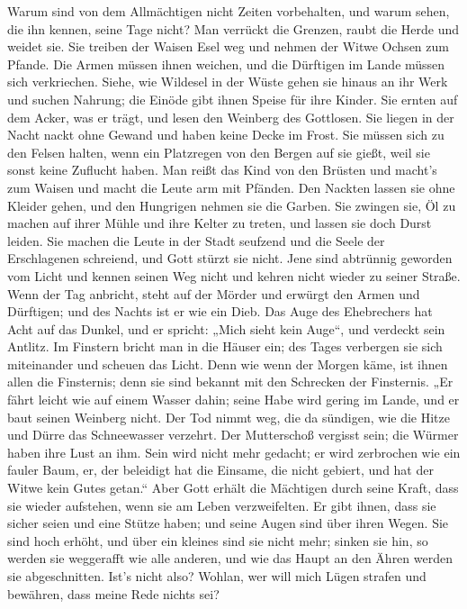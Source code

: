  Warum sind von dem Allmächtigen nicht Zeiten vorbehalten,
und warum sehen, die ihn kennen, seine Tage nicht?  Man
verrückt die Grenzen, raubt die Herde und weidet sie.  Sie
treiben der Waisen Esel weg und nehmen der Witwe Ochsen zum Pfande.
 Die Armen müssen ihnen weichen, und die Dürftigen im
Lande müssen sich verkriechen.  Siehe, wie Wildesel in der
Wüste gehen sie hinaus an ihr Werk und suchen Nahrung; die Einöde gibt
ihnen Speise für ihre Kinder.  Sie ernten auf dem Acker,
was er trägt, und lesen den Weinberg des Gottlosen.  Sie
liegen in der Nacht nackt ohne Gewand und haben keine Decke im Frost.
 Sie müssen sich zu den Felsen halten, wenn ein Platzregen
von den Bergen auf sie gießt, weil sie sonst keine Zuflucht haben.
 Man reißt das Kind von den Brüsten und macht's zum Waisen
und macht die Leute arm mit Pfänden.  Den Nackten lassen
sie ohne Kleider gehen, und den Hungrigen nehmen sie die Garben.
 Sie zwingen sie, Öl zu machen auf ihrer Mühle und ihre
Kelter zu treten, und lassen sie doch Durst leiden.  Sie
machen die Leute in der Stadt seufzend und die Seele der Erschlagenen
schreiend, und Gott stürzt sie nicht.  Jene sind
abtrünnig geworden vom Licht und kennen seinen Weg nicht und kehren
nicht wieder zu seiner Straße.  Wenn der Tag anbricht,
steht auf der Mörder und erwürgt den Armen und Dürftigen; und des Nachts
ist er wie ein Dieb.  Das Auge des Ehebrechers hat Acht
auf das Dunkel, und er spricht: „Mich sieht kein Auge``, und verdeckt
sein Antlitz.  Im Finstern bricht man in die Häuser ein;
des Tages verbergen sie sich miteinander und scheuen das Licht.
 Denn wie wenn der Morgen käme, ist ihnen allen die
Finsternis; denn sie sind bekannt mit den Schrecken der Finsternis.
 „Er fährt leicht wie auf einem Wasser dahin; seine Habe
wird gering im Lande, und er baut seinen Weinberg nicht. 
Der Tod nimmt weg, die da sündigen, wie die Hitze und Dürre das
Schneewasser verzehrt.  Der Mutterschoß vergisst sein;
die Würmer haben ihre Lust an ihm. Sein wird nicht mehr gedacht; er wird
zerbrochen wie ein fauler Baum,  er, der beleidigt hat
die Einsame, die nicht gebiert, und hat der Witwe kein Gutes getan.``
 Aber Gott erhält die Mächtigen durch seine Kraft, dass
sie wieder aufstehen, wenn sie am Leben verzweifelten. 
Er gibt ihnen, dass sie sicher seien und eine Stütze haben; und seine
Augen sind über ihren Wegen.  Sie sind hoch erhöht, und
über ein kleines sind sie nicht mehr; sinken sie hin, so werden sie
weggerafft wie alle anderen, und wie das Haupt an den Ähren werden sie
abgeschnitten.  Ist's nicht also? Wohlan, wer will mich
Lügen strafen und bewähren, dass meine Rede nichts sei?

